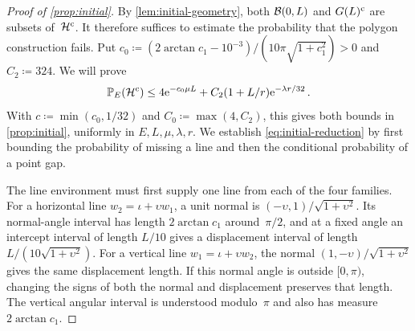 \documentclass[11pt,letterpaper]{article}
\begin{document}

\begin{proof}[Proof of \cref{prop:initial}]
By \cref{lem:initial-geometry}, both $\mathcal B(0,L)$ and $G(L)^{\mathrm{c}}$ are subsets of~$\mathcal H^{\mathrm{c}}$. It therefore suffices to estimate the probability that the polygon construction fails. Put $c_0\coloneqq(2\arctan c_1-10^{-3})/(10\pi\sqrt{1+c_1^2})>0$ and $C_2\coloneqq324$. We will prove
\begin{equation}\label{eq:initial-reduction}
  \mathbb P_E(\mathcal H^{\mathrm{c}})\le4\mathrm{e}^{-c_0\mu L}+C_2(1+L/r)\mathrm{e}^{-\lambda r/32}\,.
\end{equation}
With $c\coloneqq\min(c_0,1/32)$ and $C_0\coloneqq\max(4,C_2)$, this gives both bounds in \cref{prop:initial}, uniformly in $E,L,\mu,\lambda,r$. We establish \eqref{eq:initial-reduction} by first bounding the probability of missing a line and then the conditional probability of a point gap.

The line environment must first supply one line from each of the four families. For a horizontal line $w_2=\iota+\upsilon w_1$, a unit normal is $(-\upsilon,1)/\sqrt{1+\upsilon^2}$. Its normal-angle interval has length $2\arctan c_1$ around~$\pi/2$, and at a fixed angle an intercept interval of length $L/10$ gives a displacement interval of length $L/(10\sqrt{1+\upsilon^2})$. For a vertical line $w_1=\iota+\upsilon w_2$, the normal $(1,-\upsilon)/\sqrt{1+\upsilon^2}$ gives the same displacement length. If this normal angle is outside $[0,\pi)$, changing the signs of both the normal and displacement preserves that length. The vertical angular interval is understood modulo~$\pi$ and also has measure $2\arctan c_1$.


\end{proof}
\end{document}
